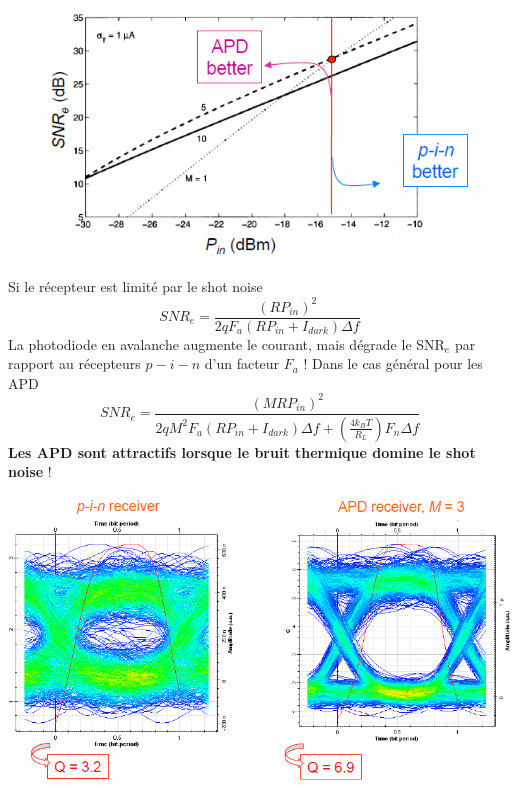\begin{figure}
\vspace{-7mm}
\includegraphics[scale=0.5]{ch5/image15}
\end{figure}
Si le récepteur est limité par le shot noise
\begin{equation}
SN{R_e} = \frac{{{{(R{P_{in}})}^2}}}{{2q{F_a}\left( {R{P_{in}} + {I_{dark}}} \right)\Delta f}}
\end{equation}
La photodiode en avalanche  augmente le courant, mais dégrade le SNR$_e$ par rapport au récepteurs
$p-i-n$ d'un facteur $F_a$ ! Dans le cas général pour les APD
\begin{equation}
SN{R_e} = \frac{{{{(MR{P_{in}})}^2}}}{{2q{M^2}{F_a}\left( {R{P_{in}} + {I_{dark}}} \right)\Delta f + \left( {\frac{{4{k_B}T}}{{{R_L}}}} \right){F_n}\Delta f}}
\end{equation}
\textbf{Les APD sont attractifs lorsque le bruit thermique domine le shot noise} !
\begin{center}
\includegraphics[scale=0.4]{ch5/image16}
\end{center}

